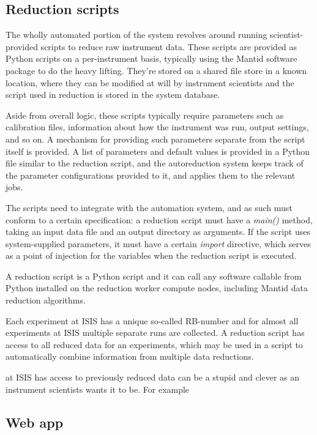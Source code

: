 \documentclass[twocolumn]{article}
\begin{document}
\subsection{Reduction scripts}\label{reduction-scripts}

The wholly automated portion of the system revolves around running
scientist-provided scripts to reduce raw instrument data. These scripts
are provided as Python scripts on a per-instrument basis, typically
using the Mantid software package to do the heavy lifting. They're
stored on a shared file store in a known location, where they can be
modified at will by instrument scientists and the script used in
reduction is stored in the system database.

Aside from overall logic, these scripts typically require parameters
such as calibration files, information about how the instrument was run,
output settings, and so on. A mechanism for providing such parameters 
separate from the script itself is provided. A list of parameters and
default values is provided in a Python file similar to the reduction
script, and the autoreduction system keeps track of the parameter
configurations provided to it, and applies them to the relevant jobs.

The scripts need to integrate with the automation system, and
as such must conform to a certain specification: a reduction script must have a
\emph{main()} method, taking an input data file and an output directory as
arguments. If the script uses system-supplied parameters, it must have a
certain \emph{import} directive, which serves as a point of injection
for the variables when the reduction script is executed.

A reduction script is a Python script and it can call any software 
callable from Python installed on the reduction worker compute nodes,
including Mantid data reduction algorithms.

Each experiment at ISIS has a unique so-called RB-number
and for almost all experiments at ISIS multiple separate runs are collected.
A reduction script has access to all reduced data for an experiments, which 
may be used in a script to automatically combine information from multiple 
data reductions.

at ISIS has access to previously reduced data can be a stupid and clever as an instrument
scientists wants it to be. For example

\subsection{Web app}\label{web-app}
\end{document}
